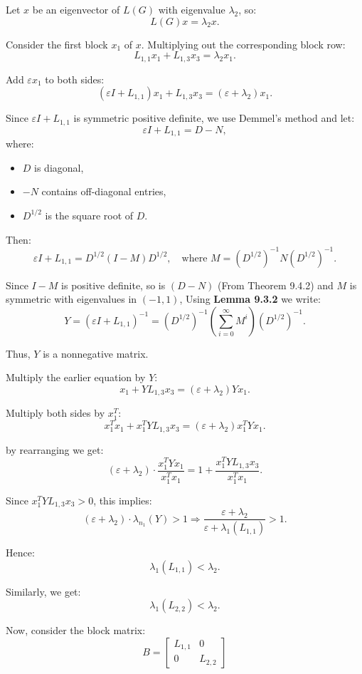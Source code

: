 \documentclass[hidelinks,12pt]{article}
\begin{document}
\newpage
\noindent Let $x$ be an eigenvector of $L(G)$ with eigenvalue $\lambda_2$, so:  
\[
L(G)x = \lambda_2 x.
\]

\noindent Consider the first block $x_1$ of $x$. Multiplying out the corresponding block row:  
\[
L_{1,1}x_1 + L_{1,3}x_3 = \lambda_2 x_1.
\]

\noindent Add $\varepsilon x_1$ to both sides:
\[
(\varepsilon I + L_{1,1})x_1 + L_{1,3}x_3 = (\varepsilon + \lambda_2)x_1.
\]

\noindent Since $\varepsilon I + L_{1,1}$ is symmetric positive definite, we use Demmel’s method and let:
\[
\varepsilon I + L_{1,1} = D - N,
\]
where:
\begin{itemize}
    \item $D$ is diagonal,
    \item $-N$ contains off-diagonal entries,
    \item $D^{1/2}$ is the square root of $D$.
\end{itemize}

\noindent Then:
\[
\varepsilon I + L_{1,1} = D^{1/2}(I - M)D^{1/2}, \quad \text{where } M = (D^{1/2})^{-1} N (D^{1/2})^{-1}.
\]

\noindent Since $I - M$ is positive definite, so is \((D-N)\) 
 (From Theorem 9.4.2) and $M$ is symmetric with eigenvalues in $(-1,1)$, Using \textbf{Lemma 9.3.2} we write:
\[
Y = (\varepsilon I + L_{1,1})^{-1} = (D^{1/2})^{-1} \left( \sum_{i=0}^{\infty} M^i \right) (D^{1/2})^{-1}.
\]

\noindent Thus, $Y$ is a nonnegative matrix.

\noindent Multiply the earlier equation by $Y$:
\[
x_1 + Y L_{1,3} x_3 = (\varepsilon + \lambda_2) Y x_1.
\]

\noindent Multiply both sides by $x_1^T$:
\[
x_1^T x_1 + x_1^T Y L_{1,3} x_3 = (\varepsilon + \lambda_2) x_1^T Y x_1.
\]

\noindent by rearranging we get:
\[
(\varepsilon + \lambda_2) \cdot \frac{x_1^T Y x_1}{x_1^T x_1} = 1 + \frac{x_1^T Y L_{1,3} x_3}{x_1^T x_1}.
\]

\noindent Since $x_1^T Y L_{1,3} x_3 > 0$, this implies:
\[
(\varepsilon + \lambda_2) \cdot \lambda_{n_1}(Y) > 1 \Rightarrow \frac{\varepsilon + \lambda_2}{\varepsilon + \lambda_1(L_{1,1})} > 1.
\]

\noindent Hence:
\[
\lambda_1(L_{1,1}) < \lambda_2.
\]

\noindent Similarly, we get:
\[
\lambda_1(L_{2,2}) < \lambda_2.
\]

\noindent Now, consider the block matrix:
\[
B =
\begin{bmatrix}
L_{1,1} & 0 \\
0 & L_{2,2}
\end{bmatrix}
\]
\end{document}
